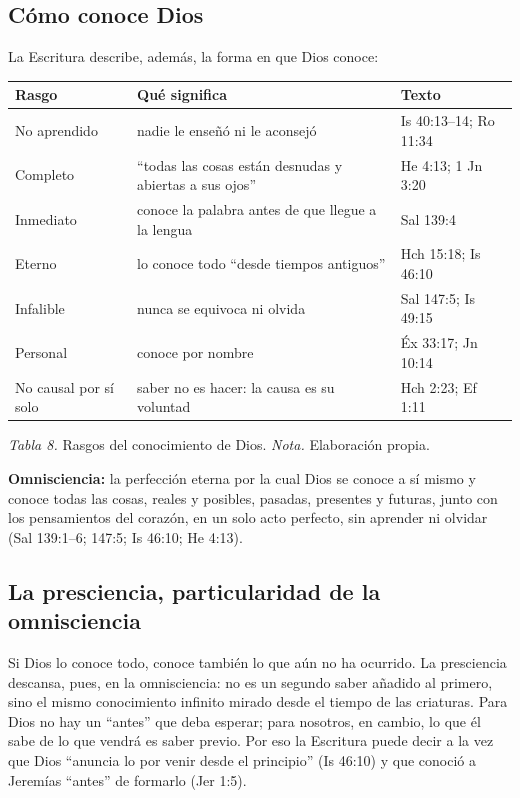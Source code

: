 \subsection{Cómo conoce Dios}
La Escritura describe, además, la forma en que Dios conoce:

\begin{center}\small\renewcommand{\arraystretch}{1.25}
\begin{tabular}{@{}L{3.0cm}L{7.0cm}L{4.4cm}@{}}
\toprule
\textbf{Rasgo} & \textbf{Qué significa} & \textbf{Texto} \\ \midrule
No aprendido & nadie le enseñó ni le aconsejó & Is 40:13--14; Ro 11:34 \\
Completo & ``todas las cosas están desnudas y abiertas a sus ojos'' & He 4:13; 1 Jn 3:20 \\
Inmediato & conoce la palabra antes de que llegue a la lengua & Sal 139:4 \\
Eterno & lo conoce todo ``desde tiempos antiguos'' & Hch 15:18; Is 46:10 \\
Infalible & nunca se equivoca ni olvida & Sal 147:5; Is 49:15 \\
Personal & conoce por nombre & Éx 33:17; Jn 10:14 \\
No causal por sí solo & saber no es hacer: la causa es su voluntad & Hch 2:23; Ef 1:11 \\
\bottomrule
\end{tabular}\par
{\footnotesize\color{gris}\textit{Tabla 8.} Rasgos del conocimiento de Dios. \textit{Nota.} Elaboración propia.}
\end{center}


\begin{tcolorbox}[colback=papiro,colframe=azul,boxrule=1pt,arc=3pt]
\textbf{Omnisciencia:} la perfección eterna por la cual Dios se conoce a sí mismo y conoce todas las cosas, reales y posibles, pasadas, presentes y futuras, junto con los pensamientos del corazón, en un solo acto perfecto, sin aprender ni olvidar (Sal 139:1--6; 147:5; Is 46:10; He 4:13).
\end{tcolorbox}

\subsection{La presciencia, particularidad de la omnisciencia}
Si Dios lo conoce todo, conoce también lo que aún no ha ocurrido. La presciencia descansa, pues, en la omnisciencia: no es un segundo saber añadido al primero, sino el mismo conocimiento infinito mirado desde el tiempo de las criaturas. Para Dios no hay un ``antes'' que deba esperar; para nosotros, en cambio, lo que él sabe de lo que vendrá es saber previo. Por eso la Escritura puede decir a la vez que Dios ``anuncia lo por venir desde el principio'' (Is 46:10) y que conoció a Jeremías ``antes'' de formarlo (Jer 1:5).

